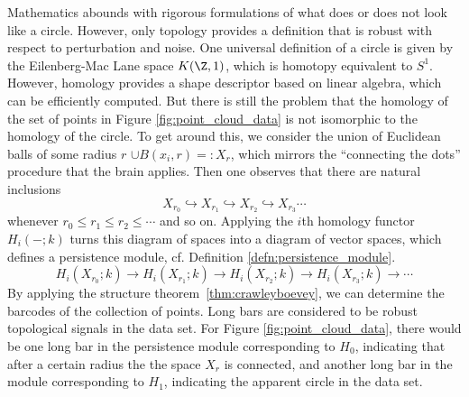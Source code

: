 Mathematics abounds with rigorous formulations of what does or does not look like a circle. However, only topology provides a definition that is robust with respect to perturbation and noise. One universal definition of a circle is given by the Eilenberg-Mac Lane space $K(\Z,1)$, which is homotopy equivalent to $S^1$. However, homology provides a shape descriptor based on linear algebra, which can be efficiently computed. But there is still the problem that the homology of the set of points in Figure \ref{fig:point_cloud_data} is not isomorphic to the homology of the circle. To get around this, we consider the union of Euclidean balls of some radius $r$ $\cup B(x_i,r)=:X_r$, which mirrors the ``connecting the dots'' procedure that the brain applies. Then one observes that there are natural inclusions
\[
	X_{r_0}\hookrightarrow X_{r_1} \hookrightarrow X_{r_2} \hookrightarrow X_{r_3} \cdots
\]
whenever $r_0\leq r_1\leq r_2 \leq \cdots$ and so on. Applying the $i$th homology functor $H_i(-;k)$ turns this diagram of spaces into a diagram of vector spaces, which defines a persistence module, cf. Definition \ref{defn:persistence_module}.
\begin{equation*}
	H_i(X_{r_0};k) \to H_i(X_{r_1};k) \to H_i(X_{r_2};k) \to H_i(X_{r_3};k) \to \cdots 
\end{equation*}
By applying the structure theorem~\ref{thm:crawleyboevey}, we can determine the barcodes of the collection of points. Long bars are considered to be robust topological signals in the data set. For Figure \ref{fig:point_cloud_data}, there would be one long bar in the persistence module corresponding to $H_0$, indicating that after a certain radius the the space $X_r$ is connected, and another long bar in the module corresponding to $H_1$, indicating the apparent circle in the data set. 


